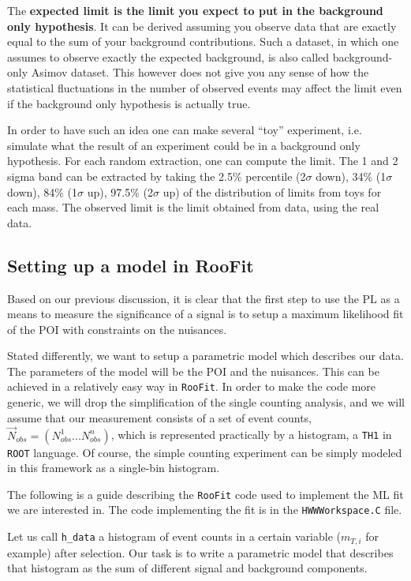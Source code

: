 \documentclass[a4paper,12pt]{article}
\begin{document}
The {\bf expected limit is the limit you expect to put in the background
only hypothesis}. It can be derived assuming you observe data that are exactly
equal to the sum of your background contributions. Such a dataset, in which one
assumes to observe exactly the expected background, is also called
background-only Asimov dataset. 
This however does not give you any sense of how the statistical fluctuations
in the number of observed events may affect the limit even if the background
only hypothesis is actually true. 

In order to have such an idea one can make several
``toy'' experiment, i.e. simulate what the result of an
experiment  could be in a background only hypothesis. For each random
extraction, one can compute the limit. The  1 and 2 sigma band can be
extracted by taking the 2.5\% percentile (2$\sigma$ down), 34\% (1$\sigma$ down), 84\% (1$\sigma$ up), 97.5\%
(2$\sigma$ up) of the distribution of limits from toys for each mass.
The observed limit is the limit obtained from data, using the real data.


\subsection{Setting up a model in RooFit}
Based on our previous discussion, it is clear that the first step to use the
PL as a means to measure the significance of a signal is to setup a maximum
likelihood fit of the POI with constraints on the nuisances.

Stated differently, we want to setup a parametric model which describes our
data. The parameters of the model will be the POI and the nuisances. This can
be achieved in a relatively easy way in \verb+RooFit+. In order to make the
code more generic, we will drop the simplification of the single counting
analysis, and we will assume that our measurement consists of a set of event counts,
$\vec{N}_{obs}=(N_{obs}^1...N_{obs}^n)$, which is represented practically by a
histogram, a \verb+TH1+ in \verb+ROOT+ language. Of course, the simple
counting experiment can be simply modeled in this framework as a single-bin
histogram.

The following is a guide describing the \verb+RooFit+ code used to implement the ML
fit we are interested in. The code implementing the fit is in the
\verb+HWWWorkspace.C+ file.

Let us call \verb+h_data+ a histogram of event counts in a certain variable
($m_{T,i}$ for example) after selection. Our task is to write a parametric
model that describes that histogram as the sum of different signal and
background components. 
\end{document}

